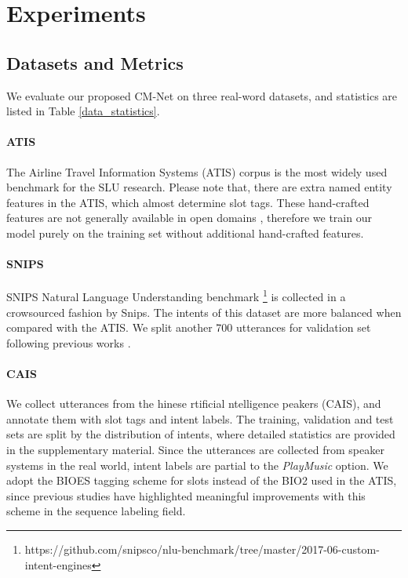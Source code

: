 \documentclass[11pt,a4paper]{article}
\begin{document}
\section{Experiments}
\label{experiments}

\subsection{Datasets and Metrics}
\label{datasets}
We evaluate our proposed CM-Net on three real-word datasets, and statistics are listed in Table \ref{data_statistics}.

\paragraph{ATIS} The Airline Travel Information Systems (ATIS) corpus \cite{atis_1990} is the most widely used benchmark for the SLU research. 
Please note that, there are extra named entity features in the ATIS, which almost determine slot tags. These hand-crafted features are not generally available in open domains \cite{a_joint_2016,a_joint_2014}, therefore we train our model purely on the training set without additional hand-crafted features.

\paragraph{SNIPS} SNIPS Natural Language Understanding benchmark \footnote{https://github.com/snipsco/nlu-benchmark/tree/master/2017-06-custom-intent-engines} \cite{snips_2018} is collected in a crowsourced fashion by Snips. The intents of this dataset are more balanced when compared with the ATIS. We split another 700 utterances for validation set following previous works \cite{slot_gated_2018, capsule_2018}.

\paragraph{CAIS} 
We collect utterances from the hinese rtificial ntelligence peakers (CAIS), and annotate them with slot tags and intent labels.
The training, validation and test sets are split by the distribution of intents, where detailed statistics are provided in the supplementary material. Since the utterances are collected from speaker systems in the real world, intent labels are partial to the \emph{PlayMusic} option.
We adopt the BIOES tagging scheme for slots instead of the BIO2 used in the ATIS, since previous studies have highlighted meaningful improvements with this scheme \cite{BIES} in the sequence labeling field. 
\end{document}
